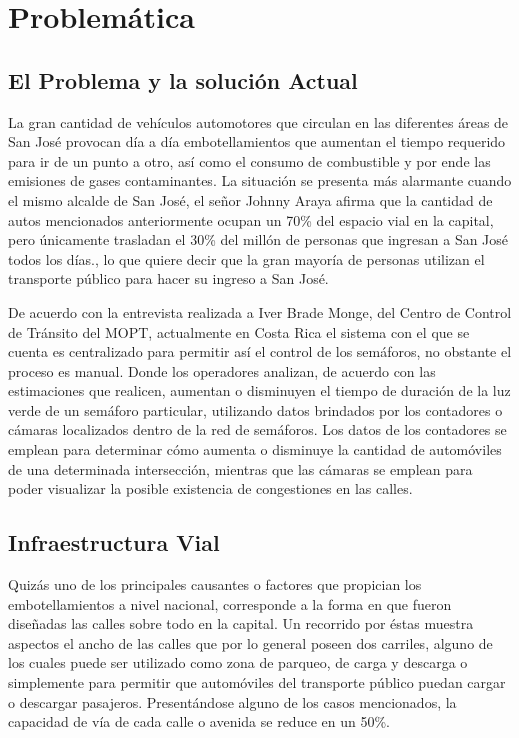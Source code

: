 \documentclass[conference]{IEEEtran}
\begin{document}
\section{Problem\'{a}tica}
	\subsection{El Problema y la soluci\'{o}n Actual}
	 
		La gran cantidad de veh\'{i}culos automotores que circulan en las diferentes \'{a}reas
	de San Jos\'{e} provocan d\'{i}a a d\'{i}a embotellamientos que aumentan el tiempo requerido para ir de un punto a otro, as\'{i} como el consumo de combustible y por ende las emisiones de gases contaminantes.
	La situaci\'{o}n se presenta m\'{a}s alarmante cuando el mismo alcalde de San Jos\'{e}, el
	se\~{n}or Johnny Araya afirma que la cantidad de autos mencionados
	anteriormente ocupan un 70\% del espacio vial en la capital, pero \'{u}nicamente trasladan el 30\% del mill\'{o}n de personas que ingresan a San Jos\'{e} todos los d\'{i}as.\cite{Villegas2012}, lo que quiere decir que la gran mayor\'ia de personas utilizan el transporte p\'ublico para hacer su ingreso a San Jos\'e.

		De acuerdo con la entrevista realizada a Iver Brade Monge, del Centro de
	Control de Tr\'{a}nsito del MOPT,  actualmente en Costa Rica el sistema con el que se cuenta es centralizado para permitir as\'{i} el control de los sem\'{a}foros, no obstante el proceso
	es manual. Donde los operadores analizan, de
	acuerdo con las estimaciones que realicen, aumentan o disminuyen el tiempo de duraci\'{o}n de la luz verde de un sem\'{a}foro particular, utilizando datos brindados por los contadores o c\'{a}maras localizados dentro de la red de sem\'{a}foros. Los datos de los contadores se emplean para determinar c\'omo aumenta o disminuye la cantidad de autom\'{o}viles de una determinada intersecci\'{o}n, mientras que las c\'{a}maras se emplean para poder visualizar la posible existencia de congestiones en las calles.

	\subsection{Infraestructura Vial}
	Quiz\'{a}s uno de los principales causantes o factores que propician los embotellamientos a nivel nacional, corresponde a la forma en que fueron dise\~{n}adas las calles sobre todo en la capital. Un recorrido por \'{e}stas muestra aspectos el ancho de las calles que por lo general poseen dos carriles, alguno de los cuales puede ser utilizado como zona de parqueo, de carga y descarga o simplemente para permitir que autom\'oviles del transporte p\'ublico puedan cargar o descargar pasajeros. Present\'{a}ndose alguno de los casos mencionados, la capacidad de v\'ia  de cada calle o avenida se reduce en un 50\%. 	
	
\end{document}
